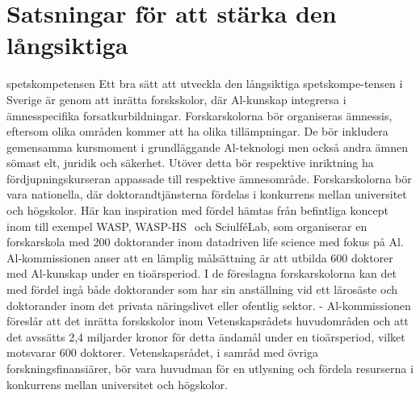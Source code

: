 {{{{{{{{{{{{{{\section*{Satsningar för att stärka den långsiktiga}
spetskompetensen
Ett bra sätt att utveckla den långsiktiga spetskompe-tensen i Sverige är genom att inrätta forskskolor, där Al-kunskap integrersa i ämnesspecifika forsatkurbildningar. Forskarskolorna bör organiseras ämnessis, eftersom olika områden kommer att ha olika tillämpningar. De bör inkludera gemensamma kursmoment i grundläggande Al-teknologi men också andra ämnen sömast elt, juridik och säkerhet. Utöver detta bör respektive inriktning ha fördjupningskurseran appassade till respektive ämnesområde.
Forskarskolorna bör vara nationella, där doktorandtjänsterna fördelas i konkurrens mellan universitet och högskolor. Här kan inspiration med fördel hämtas från befintliga koncept inom till exempel WASP, WASP-HS \({ }^{}\) och SciulféLab, som organiserar en forskarskola med 200 doktorander inom datadriven life science med fokus på Al. Al-kommissionen anser att en lämplig målsättning är att utbilda 600 doktorer med Al-kunskap under en tioärsperiod. I de föreslagna forskarskolorna kan det med fördel ingå både doktorander som har sin anställning vid ett lärosäste och doktorander inom det privata näringslivet eller ofentlig sektor.
- Al-kommissionen föreslår att det inrätta forskskolor inom Vetenskapsrådets huvudområden och att det avssätts 2,4 miljarder kronor för detta ändamål under en tioärsperiod, vilket motsvarar 600 doktorer. Vetenskapsrådet, i samråd med övriga forskningsfinansiärer, bör vara huvudman för en utlysning och fördela resurserna i konkurrens mellan universitet och högskolor.
}}}}}}}}}}}}}}
